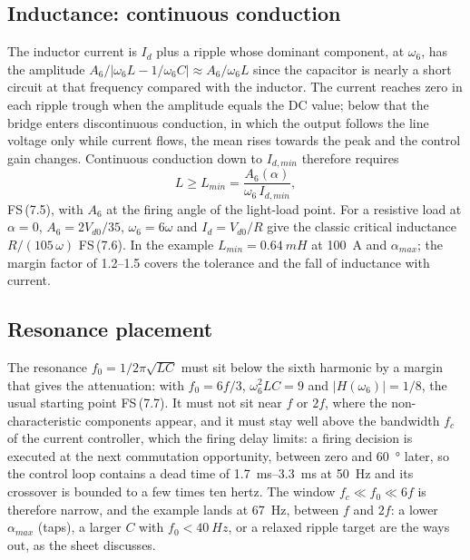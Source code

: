 \documentclass[10pt,a4paper]{scrartcl}
\newcommand{\Vdo}{V_{d0}}
\newcommand{\Id}{I_{d}}
\newcommand{\fs}[1]{\textsf{FS}\,(#1)}
\begin{document}
\subsection{Inductance: continuous conduction}\label{sec:lmin}
The inductor current is $\Id$ plus a ripple whose dominant component, at $\omega_6$, has the amplitude $A_6/|\omega_6L - 1/\omega_6C|\approx A_6/\omega_6L$ since the capacitor is nearly a short circuit at that frequency compared with the inductor. The current reaches zero in each ripple trough when the amplitude equals the DC value; below that the bridge enters discontinuous conduction, in which the output follows the line voltage only while current flows, the mean rises towards the peak and the control gain changes. Continuous conduction down to $I_{d,min}$ therefore requires
\begin{equation}
L \ge L_{min} = \frac{A_6(\alpha)}{\omega_6\,I_{d,min}} ,
\label{eq:Lminderiv}
\end{equation}
\fs{7.5}, with $A_6$ at the firing angle of the light-load point. For a resistive load at $\alpha = 0$, $A_6 = 2\Vdo/35$, $\omega_6 = 6\omega$ and $\Id = \Vdo/R$ give the classic critical inductance $R/(105\,\omega)$ \fs{7.6}. In the example $L_{min} = \SI{0.64}{mH}$ at \SI{100}{A} and $\alpha_{max}$; the margin factor of 1.2--1.5 covers the tolerance and the fall of inductance with current.

\subsection{Resonance placement}
The resonance $f_0 = 1/2\pi\sqrt{LC}$ must sit below the sixth harmonic by a margin that gives the attenuation: with $f_0 = 6f/3$, $\omega_6^2LC = 9$ and $|H(\omega_6)| = 1/8$, the usual starting point \fs{7.7}. It must not sit near $f$ or $2f$, where the non-characteristic components appear, and it must stay well above the bandwidth $f_c$ of the current controller, which the firing delay limits: a firing decision is executed at the next commutation opportunity, between zero and \SI{60}{\degree} later, so the control loop contains a dead time of \SIrange{1.7}{3.3}{ms} at \SI{50}{Hz} and its crossover is bounded to a few times ten hertz. The window $f_c\ll f_0\ll 6f$ is therefore narrow, and the example lands at \SI{67}{Hz}, between $f$ and $2f$: a lower $\alpha_{max}$ (taps), a larger $C$ with $f_0<\SI{40}{Hz}$, or a relaxed ripple target are the ways out, as the sheet discusses.
\end{document}
